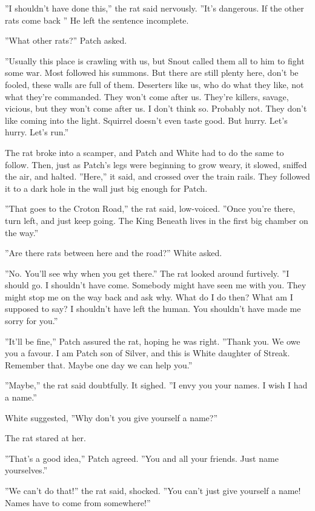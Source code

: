 \documentclass[11pt]{article}
\begin{document}
 ''I shouldn't have done this,'' the rat said nervously. ''It's dangerous. If the other rats come back %
'' He left the sentence incomplete.\par
 ''What other rats?'' Patch asked.\par
 ''Usually this place is crawling with us, but Snout called them all to him to fight some war. Most followed his summons. But there are still plenty here, don't be fooled, these walls are full of them. Deserters like us, who do what they like, not what they're commanded. They won't come after us. They're killers, savage, vicious, but they won't come after us. I don't think so. Probably not. They don't like coming into the light. Squirrel doesn't even taste good. But hurry. Let's hurry. Let's run.''\par
 The rat broke into a scamper, and Patch and White had to do the same to follow. Then, just as Patch's legs were beginning to grow weary, it slowed, sniffed the air, and halted. ''Here,'' it said, and crossed over the train rails. They followed it to a dark hole in the wall just big enough for Patch.\par
 ''That goes to the Croton Road,'' the rat said, low-voiced. ''Once you're there, turn left, and just keep going. The King Beneath lives in the first big chamber on the way.''\par
 ''Are there rats between here and the road?'' White asked.\par
 ''No. You'll see why when you get there.'' The rat looked around furtively. ''I should go. I shouldn't have come. Somebody might have seen me with you. They might stop me on the way back and ask why. What do I do then? What am I supposed to say? I shouldn't have left the human. You shouldn't have made me sorry for you.''\par
 ''It'll be fine,'' Patch assured the rat, hoping he was right. ''Thank you. We owe you a favour. I am Patch son of Silver, and this is White daughter of Streak. Remember that. Maybe one day we can help you.''\par
 ''Maybe,'' the rat said doubtfully. It sighed. ''I envy you your names. I wish I had a name.''\par
 White suggested, ''Why don't you give yourself a name?''\par
 The rat stared at her.\par
 ''That's a good idea,'' Patch agreed. ''You and all your friends. Just name yourselves.''\par
 ''We can't do that!'' the rat said, shocked. ''You can't just give yourself a name! Names have to come from somewhere!''\par
\end{document}
